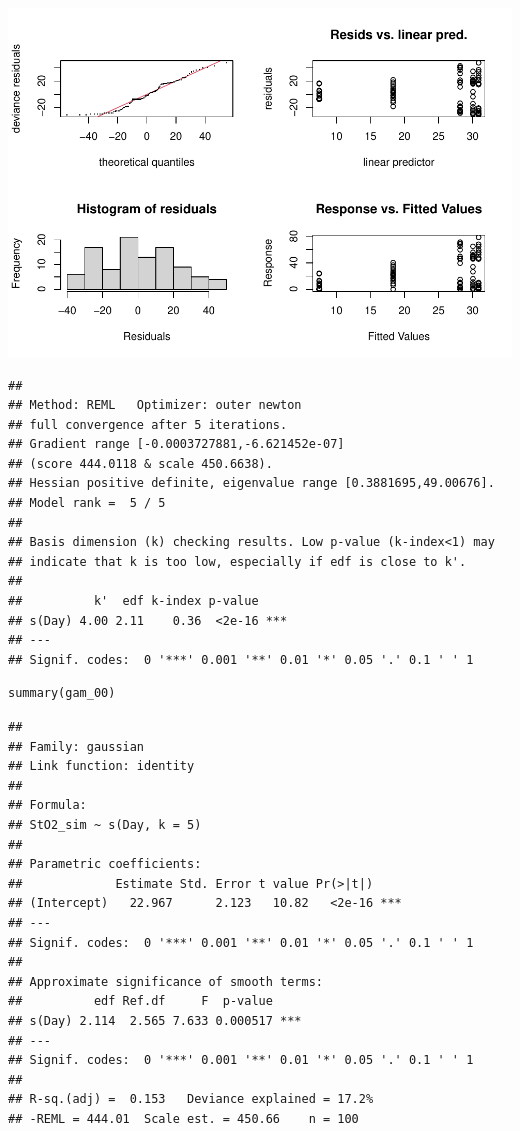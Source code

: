 \documentclass[Royal,times,sagev]{sagej}
\begin{document}
\includegraphics{Full_document_SAGE_files/figure-latex/first-GAM-check-1.pdf}

\begin{verbatim}
## 
## Method: REML   Optimizer: outer newton
## full convergence after 5 iterations.
## Gradient range [-0.0003727881,-6.621452e-07]
## (score 444.0118 & scale 450.6638).
## Hessian positive definite, eigenvalue range [0.3881695,49.00676].
## Model rank =  5 / 5 
## 
## Basis dimension (k) checking results. Low p-value (k-index<1) may
## indicate that k is too low, especially if edf is close to k'.
## 
##          k'  edf k-index p-value    
## s(Day) 4.00 2.11    0.36  <2e-16 ***
## ---
## Signif. codes:  0 '***' 0.001 '**' 0.01 '*' 0.05 '.' 0.1 ' ' 1
\end{verbatim}

\begin{verbatim}
summary(gam_00)
\end{verbatim}

\begin{verbatim}
## 
## Family: gaussian 
## Link function: identity 
## 
## Formula:
## StO2_sim ~ s(Day, k = 5)
## 
## Parametric coefficients:
##             Estimate Std. Error t value Pr(>|t|)    
## (Intercept)   22.967      2.123   10.82   <2e-16 ***
## ---
## Signif. codes:  0 '***' 0.001 '**' 0.01 '*' 0.05 '.' 0.1 ' ' 1
## 
## Approximate significance of smooth terms:
##          edf Ref.df     F  p-value    
## s(Day) 2.114  2.565 7.633 0.000517 ***
## ---
## Signif. codes:  0 '***' 0.001 '**' 0.01 '*' 0.05 '.' 0.1 ' ' 1
## 
## R-sq.(adj) =  0.153   Deviance explained = 17.2%
## -REML = 444.01  Scale est. = 450.66    n = 100
\end{verbatim}
\end{document}
